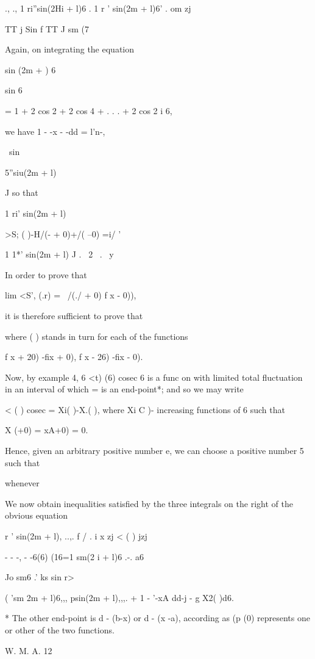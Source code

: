 ., ., 1 ri''sin(2Hi + l)6 . 1 r ' sin(2m + l)6' . om zj

TT j Sin f TT J sm (7

Again, on integrating the equation

sin (2m + ) 6

sin 6

= 1 + 2 cos 2 + 2 cos 4 + . . . + 2 cos 2 i 6,

we have 1 - -x - -dd = l'n-,

\ sin

5''siu(2m + l)

J so that

1 ri' sin(2m + l)

>S; ( )-H/(- + 0)+/( --0) =i/ '

  1 1*' sin(2m + l) J . \ 2 \, . \ y

In order to prove that

lim <S', (.r) = \ /(./ + 0) f x - 0)),

it is therefore sufficient to prove that

where ( ) stands in turn for each of the functions

f x + 20) -fix + 0), f x - 26) -fix - 0).

Now, by example 4, 6 <t) (6) cosec 6 is a func on with limited
total fluctuation in an interval of which = is an end-point*; and so
we may write

  < ( ) cosec = Xi( )-X.( ), where Xi C )- %
increasing functions of 6 such that

X (+0) = xA+0) = 0.

Hence, given an arbitrary positive number e, we can choose a positive
number 5 such that

whenever %

We now obtain inequalities satisfied by the three integrals on the
right of the obvious equation

r ' sin(2m + l), ..,. f  / . i x zj < ( ) jzj

 - - -, - -6(6) (16=1 sm(2 i + l)6 .-. a6

Jo sm6 .' ks sin r>

( 'sm 2m + l)6,,, psin(2m + l),,,. + 1 - '-xA dd-j - g X2( )d6.

* The other end-point is d - (b-x) or d - (x -a), according as (p (0)
represents one or other of the two functions.

W. M. A. 12

%
%

